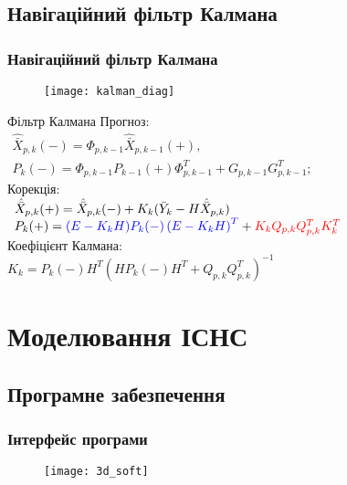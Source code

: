 \documentclass[ucs,compress]{beamer}    %
\begin{document}
\subsection{Навігаційний фільтр Калмана} 
\begin{frame}[plain]
\frametitle{Навігаційний фільтр Калмана}
\begin{figure}[l]
\texttt{[image: kalman\_diag]}
\end{figure}
\begin{block}{Фільтр Калмана}
\small
Прогноз: \\
$\begin{array}{l} 
{\hat{\bar{X}}_{p,k}(-) =\Phi_{p,k-1} \hat{\bar{X}}_{p,k-1}(+) ,} \\ 
{P_{k}(-) =\Phi_{p,k-1} P_{k-1}(+) \Phi ^{T}_{p,k-1} +G_{p,k-1} G_{p,k-1}^{T} ;} \end{array} $ \\
Корекція:\\
$\begin{array}{l} 
{\hat{\bar{X}}_{p,k}(+)=\hat{\bar{X}}_{p,k}(-) + K_{k} (\bar{Y}_{k} -H\hat{\bar{X}}_{p,k} )} \\ 
{P_{k}(+)={\color{blue}(E-K_{k} H)P_{k}(-) \left(E-K_{k} H\right)^{T}} +{\color{red} K_{k} Q_{p,k} Q_{p,k} ^{T} K_{k}^{T}} } 
\end{array} $ \\
Коефіцієнт Калмана:\\
$K_{k} =P_{k}(-) H^{T} (HP_{k}(-) H^{T} +Q_{p,k} Q_{p,k} ^{T} )^{-1} $
\end{block}
\end{frame}

\section{Моделювання ІСНС} 
\subsection{Програмне забезпечення} 
\begin{frame}%
\frametitle{Інтерфейс програми}
\begin{figure}
\centering
\texttt{[image: 3d\_soft]}
\end{figure}
\end{frame}

\end{document}
